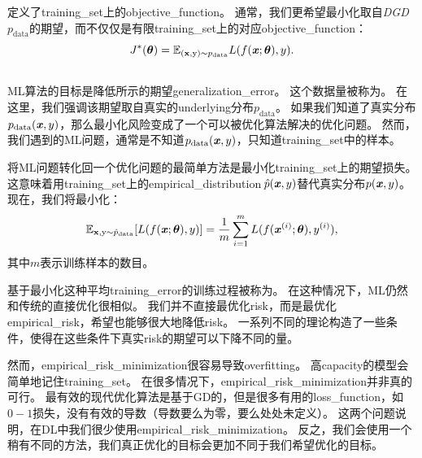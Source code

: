定义了\gls{training_set}上的\gls{objective_function}。
通常，我们更希望最小化取自\emph{\gls{DGD}}\,$p_{\text{data}}$的期望，而不仅仅是有限\gls{training_set}上的对应\gls{objective_function}：
\begin{equation}
\label{eq:8.2}
    J^*(\Vtheta) = \SetE_{(\RVx, \RSy) \sim p_\text{data}} L(f(\Vx ;\Vtheta),y). %
\end{equation}


\subsection{}
\label{sec:empirical_risk_minimization}
\gls{ML}算法的目标是降低所示的期望\gls{generalization_error}。
这个数据量被称为。
在这里，我们强调该期望取自真实的\gls{underlying}分布$p_{\text{data}}$。
如果我们知道了真实分布$p_{\text{data}}(\boldsymbol{\mathit{x}}, y)$，那么最小化风险变成了一个可以被优化算法解决的优化问题。
然而，我们遇到的\gls{ML}问题，通常是不知道$p_\text{data}(\boldsymbol{\mathit{x}}, y)$，只知道\gls{training_set}中的样本。


将\gls{ML}问题转化回一个优化问题的最简单方法是最小化\gls{training_set}上的期望损失。
这意味着用\gls{training_set}上的\gls{empirical_distribution}\,$\hat{p}(\boldsymbol{\mathit{x}},y)$替代真实分布$p(\boldsymbol{\mathit{x}},y)$。
现在，我们将最小化：
\begin{equation}
\label{eq:8.3}
    \SetE_{\RVx, \RSy \sim \hat{p}_\text{data}} [L(f(\Vx ; \Vtheta), y)] %
    = \frac{1}{m} \sum_{i=1}^m L( f(\Vx^{(i)}; \Vtheta), y^{(i)}) ,
\end{equation}
其中$m$表示训练样本的数目。


基于最小化这种平均\gls{training_error}的训练过程被称为。
在这种情况下，\gls{ML}仍然和传统的直接优化很相似。
我们并不直接最优化\gls{risk}，而是最优化\gls{empirical_risk}，希望也能够很大地降低\gls{risk}。
一系列不同的理论构造了一些条件，使得在这些条件下真实\gls{risk}的期望可以下降不同的量。


然而，\gls{empirical_risk_minimization}很容易导致\gls{overfitting}。
高\gls{capacity}的模型会简单地记住\gls{training_set}。
在很多情况下，\gls{empirical_risk_minimization}并非真的可行。
最有效的现代优化算法是基于\gls{GD}的，但是很多有用的\gls{loss_function}，如$0-1$损失，没有有效的导数（导数要么为零，要么处处未定义）。
这两个问题说明，在\gls{DL}中我们很少使用\gls{empirical_risk_minimization}。
反之，我们会使用一个稍有不同的方法，我们真正优化的目标会更加不同于我们希望优化的目标。


